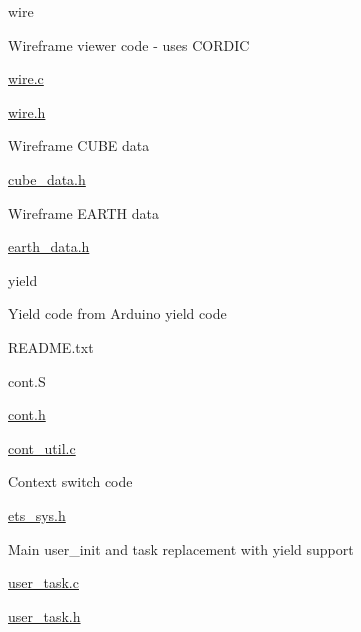 wire
\begin{DoxyItemize}
\item Wireframe viewer code -\/ uses C\+O\+R\+D\+IC
\begin{DoxyItemize}
\item \hyperlink{wire_8c}{wire.\+c}
\item \hyperlink{wire_8h}{wire.\+h}
\end{DoxyItemize}
\item Wireframe C\+U\+BE data
\begin{DoxyItemize}
\item \hyperlink{cube__data_8h}{cube\+\_\+data.\+h}
\end{DoxyItemize}
\item Wireframe E\+A\+R\+TH data
\begin{DoxyItemize}
\item \hyperlink{earth__data_8h}{earth\+\_\+data.\+h}
\end{DoxyItemize}
\end{DoxyItemize}

yield
\begin{DoxyItemize}
\item Yield code from Arduino yield code
\item R\+E\+A\+D\+M\+E.\+txt
\item cont.\+S
\item \hyperlink{cont_8h}{cont.\+h}
\item \hyperlink{cont__util_8c}{cont\+\_\+util.\+c}
\begin{DoxyItemize}
\item Context switch code
\end{DoxyItemize}
\item \hyperlink{ets__sys_8h}{ets\+\_\+sys.\+h}
\item Main user\+\_\+init and task replacement with yield support
\begin{DoxyItemize}
\item \hyperlink{user__task_8c}{user\+\_\+task.\+c}
\item \hyperlink{user__task_8h}{user\+\_\+task.\+h}
\end{DoxyItemize}
\end{DoxyItemize}

